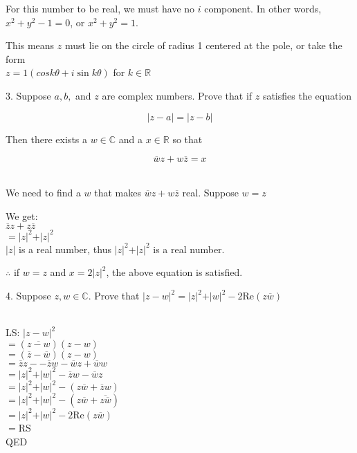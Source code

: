 \documentclass{letter}
\begin{document}
	For this number to be real, we must have no $i$ component. In other words, $x^2 + y^2 - 1 = 0$, or $x^2 + y^2 = 1$.
	
	This means $z$ must lie on the circle of radius 1 centered at the pole, or take the form\\ $z = 1(cos k \theta + i \sin k \theta)$ for $k \in \mathbb{R}$
	
	\clearpage
	
	3. Suppose $a, b,$ and $z$ are complex numbers. Prove that if $z$ satisfies the equation
	
	\[ \vert z - a \vert = \vert z - b \vert \]
	
	Then there exists a $w \in \mathbb{C}$ and a $x \in \mathbb{R}$ so that
	
	\[ \overline{w}z + w\overline{z} = x \]
	
	\hrulefill\\
	
	We need to find a $w$ that makes $\overline{w}z + w\overline{z}$ real. Suppose $w = z$
	
	We get:\\ $\overline{z}z + z\overline{z}$\\
	$= \vert z \vert^2 + \vert z \vert^2$\\
	$\vert z \vert$ is a real number, thus $\vert z \vert ^2 + \vert z \vert ^2$ is a real number.
	
	$\therefore$ if $w = z$ and $x = 2\vert z \vert^2$, the above equation is satisfied.
	
	\clearpage
	
	4. Suppose $z, w \in \mathbb{C}$. Prove that $\vert z - w \vert^2 = \vert z \vert^2 + \vert w \vert^2 - 2$Re$(z\overline{w})$
	
	\hrulefill\\
	
	LS: $\vert z - w \vert^2$\\
	$= (\overline{z - w})(z-w)$\\
	$= (\overline{z} - \overline{w})(z-w)$\\
	$= \overline{z}z - - \overline{z}w - \overline{w}z + \overline{w}w$\\
	$= \vert z \vert^2 + \vert w \vert^2 - \overline{z}w - \overline{w}z$\\
	$= \vert z \vert^2 + \vert w \vert^2 - (z\overline{w} + \overline{z}w)$\\
	$= \vert z \vert^2 + \vert w \vert^2 - (z\overline{w} + \overline{z\overline{w}})$\\
	$=\vert z \vert^2 + \vert w \vert^2 - 2$Re$(z\overline{w})$\\
	$= $RS\\
	QED
	
\end{document}
